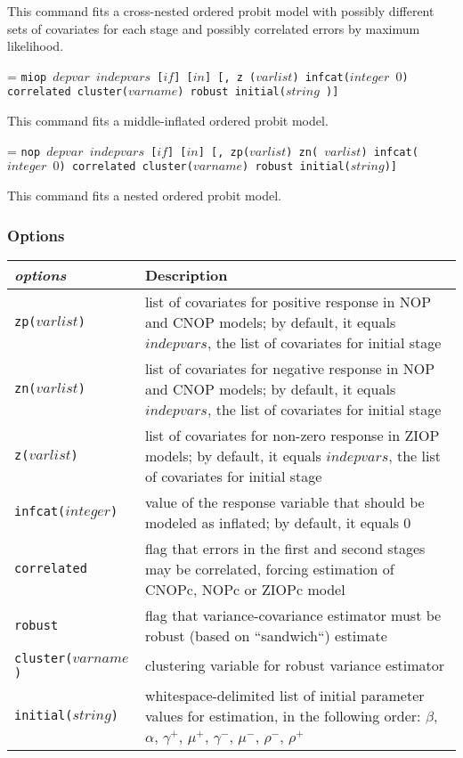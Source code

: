 \documentclass[letterpaper,fleqn,11pt]{article}
\begin{document}
This command fits a cross-nested ordered probit model with possibly
different sets of covariates for each stage and possibly correlated errors
by maximum likelihood.

\hangindent=\parindent
\noindent \texttt{miop $depvar$ $indepvars$ [$if$] [$in$] [, z ($varlist$)
infcat($integer$ $0$) correlated cluster($varname$) robust initial($string$%
)] }

This command fits a middle-inflated ordered probit model.

\hangindent=\parindent
\noindent \texttt{nop $depvar$ $indepvars$ [$if$] [$in$] [, zp($varlist$) zn(%
$varlist$) infcat($integer$ $0$) correlated cluster($varname$) robust
initial($string$)] }

This command fits a nested ordered probit model.


\subsubsection*{Options}

\begin{tabular}{lp{12cm}}
\textit{options} & Description \\ 
\midrule \texttt{zp($varlist$)} & list of covariates for positive response
in NOP and CNOP models; by default, it equals $indepvars$, the list of
covariates for initial stage \\ 
\texttt{zn($varlist$)} & list of covariates for negative response in NOP and
CNOP models; by default, it equals $indepvars$, the list of covariates for
initial stage \\ 
\texttt{z($varlist$)} & list of covariates for non-zero response in ZIOP
models; by default, it equals $indepvars$, the list of covariates for
initial stage \\ 
\texttt{infcat($integer$)} & value of the response variable that should be
modeled as inflated; by default, it equals 0 \\ 
\texttt{correlated} & flag that errors in the first and second stages may be
correlated, forcing estimation of CNOPc, NOPc or ZIOPc model \\ 
\texttt{robust} & flag that variance-covariance estimator must be robust
(based on ``sandwich``) estimate \\ 
\texttt{cluster($varname$)} & clustering variable for robust variance
estimator \\ 
\texttt{initial($string$)} & whitespace-delimited list of initial parameter
values for estimation, in the following order: $\beta$, $\alpha$, $\gamma^{+}
$, $\mu^{+}$, $\gamma^{-}$, $\mu^{-}$, $\rho^{-}$, $\rho^{+}$%
\end{tabular}
\end{document}
